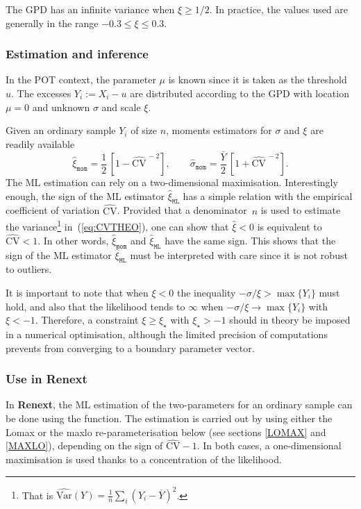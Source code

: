 \documentclass[a4paper]{report}
\newcommand{\pkg}[1]{\textbf{#1}}
\newcommand{\Var}{\textrm{Var}}
\begin{document}
The GPD has an infinite variance when $\xi \geqslant 1/2$. 
In practice, the values used are generally in the range 
$-0.3 \leqslant \xi \leqslant 0.3$.

\subsubsection*{Estimation and inference}
In the POT context, the parameter $\mu$ is known since 
it is taken as the threshold~$u$. The excesses
$Y_i:=X_i-u$ are distributed according to the GPD with location 
$\mu=0$ and unknown $\sigma$ and scale $\xi$.

Given an ordinary sample $Y_i$ of size $n$, moments estimators for
$\sigma$ and $\xi$ are readily available
$$
   \widehat{\xi}_{\texttt{mom}} = 
   \frac{1}{2}\,\left[1 - \widehat{\textrm{CV}}^{\,-2}\right], \qquad
   \widehat{\sigma}_{\texttt{mom}} = \frac{\bar{Y}}{2}\,\left[1 + 
     \widehat{\textrm{CV}}^{\,-2}\right].
$$
%
The ML estimation can rely on a two-dimensional maximisation.  Interestingly enough,
the sign of the ML estimator $\widehat{\xi}_{\texttt{ML}}$ has a simple relation with the
empirical coefficient of variation 
$\widehat{\mathrm{CV}}$. Provided that a 
\label{SignXI}
denominator~$n$ is used to estimate the
variance\footnote{That is $\widehat{\Var}(Y) = \frac{1}{n} \sum_i (Y_i -
  \overline{Y})^2$.}  in~(\ref{eq:CVTHEO}), one can show that $\widehat{\xi} <
0$ is equivalent to $\widehat{\mathrm{CV}} < 1$.  In other words, 
$\widehat{\xi}_{\texttt{mom}}$ and $\widehat{\xi}_{\texttt{ML}}$
have the same sign. This shows that the sign of
the ML estimator $\widehat{\xi}_{\texttt{ML}}$ must be interpreted with care 
since it is not robust to outliers.

It is important to note that when $\xi < 0$ the inequality $-\sigma /
\xi > \max\{ Y_i\}$ must hold, and also that the likelihood tends to
$\infty$ when $- \sigma / \xi \to \max\{ Y_i\}$ with $\xi <
-1$. Therefore, a constraint $\xi \geqslant \xi_{\star}$ with
$\xi_{\star}> -1$ should in theory be imposed in a numerical optimisation,
although the limited precision of computations prevents from converging
to a boundary parameter vector.


\subsubsection*{Use in Renext}
In \pkg{Renext}, the ML estimation of the two-parameters for an
ordinary sample can be done using the \verb@fGPD@ function.
The estimation is carried out by using either the Lomax or the maxlo
re-parameterisation below (see sections \ref{LOMAX} and \ref{MAXLO}),
depending on the sign of $\widehat{\mathrm{CV}}-1$. In both cases, a
one-dimensional maximisation is used thanks to a concentration of the
likelihood.
\end{document}
